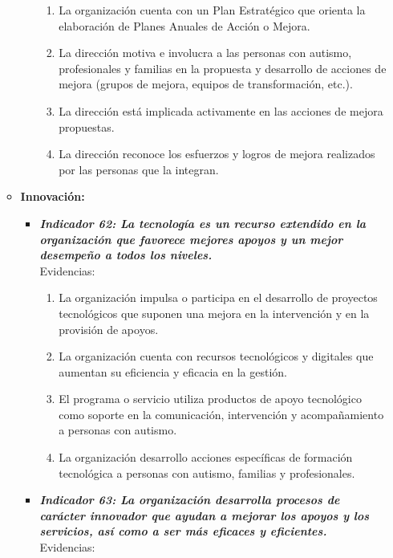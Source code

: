 \begin{itemize}
\begin{itemize}
\begin{itemize}
			\begin{enumerate}
				\item La organización cuenta con un Plan Estratégico que orienta la elaboración de Planes Anuales de Acción o Mejora. 
				\item La dirección motiva e involucra a las personas con autismo, profesionales y familias en la propuesta y desarrollo de acciones de mejora (grupos de mejora, equipos de transformación, etc.). 
				\item La dirección está implicada activamente en las acciones de mejora propuestas. 
				\item La dirección reconoce los esfuerzos y logros de mejora realizados por las personas que la integran. 
				
			\end{enumerate} 
		\end{itemize}

		\item \textbf{Innovación:}
		\begin{itemize}
			\item \textbf{\textit{Indicador 62: La tecnología es un recurso extendido en la organización que favorece mejores apoyos y un mejor desempeño a todos los niveles.}}\\Evidencias:
			
			\begin{enumerate}
				\item La organización impulsa o participa en el desarrollo de proyectos tecnológicos que suponen una mejora en la intervención y en la provisión de apoyos. 
				\item La organización cuenta con recursos tecnológicos y digitales que aumentan su eficiencia y eficacia en la gestión. 
				\item El programa o servicio utiliza productos de apoyo tecnológico como soporte en la comunicación, intervención y acompañamiento a personas con autismo. 
				\item La organización desarrollo acciones específicas de formación tecnológica a personas con autismo, familias y profesionales.
			\end{enumerate}

			\item \textbf{\textit{Indicador 63: La organización desarrolla procesos de carácter innovador que ayudan a mejorar los apoyos y los servicios, así como a ser más eficaces y eficientes.}}\\Evidencias:
			

\end{itemize}
\end{itemize}
\end{itemize}
